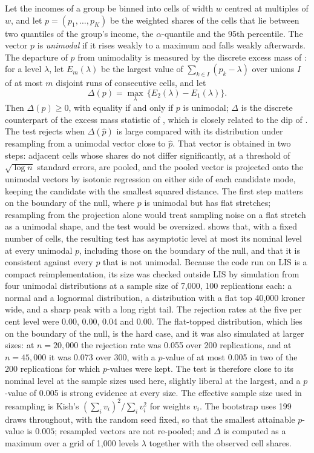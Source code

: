 Let the incomes of a group be binned into cells of width $w$ centred at multiples of $w$, and let $p=(p_1,\dots,p_K)$ be the weighted shares of the cells that lie between two quantiles of the group's income, the $\alpha$-quantile and the 95th percentile. The vector $p$ is \emph{unimodal} if it rises weakly to a maximum and falls weakly afterwards. The departure of $p$ from unimodality is measured by the discrete excess mass of \citet{MullerSawitzki1991}: for a level $\lambda$, let $E_m(\lambda)$ be the largest value of $\sum_{k\in I}(p_k-\lambda)$ over unions $I$ of at most $m$ disjoint runs of consecutive cells, and let
\[
\Delta(p)=\max_{\lambda}\,\{E_2(\lambda)-E_1(\lambda)\}.
\]
Then $\Delta(p)\ge0$, with equality if and only if $p$ is unimodal; $\Delta$ is the discrete counterpart of the excess mass statistic of \citet{MullerSawitzki1991}, which is closely related to the dip of \citet{HartiganHartigan1985}. The test rejects when $\Delta(\hat p)$ is large compared with its distribution under resampling from a unimodal vector close to $\hat p$. That vector is obtained in two steps: adjacent cells whose shares do not differ significantly, at a threshold of $\sqrt{\log n}$ standard errors, are pooled, and the pooled vector is projected onto the unimodal vectors by isotonic regression on either side of each candidate mode, keeping the candidate with the smallest squared distance. The first step matters on the boundary of the null, where $p$ is unimodal but has flat stretches; resampling from the projection alone would treat sampling noise on a flat stretch as a unimodal shape, and the test would be oversized. \citet{Orujov2026} shows that, with a fixed number of cells, the resulting test has asymptotic level at most its nominal level at every unimodal $p$, including those on the boundary of the null, and that it is consistent against every $p$ that is not unimodal. Because the code run on LIS is a compact reimplementation, its size was checked outside LIS by simulation from four unimodal distributions at a sample size of 7{,}000, 100 replications each: a normal and a lognormal distribution, a distribution with a flat top 40{,}000 kroner wide, and a sharp peak with a long right tail. The rejection rates at the five per cent level were 0.00, 0.00, 0.04 and 0.00. The flat-topped distribution, which lies on the boundary of the null, is the hard case, and it was also simulated at larger sizes: at $n=20{,}000$ the rejection rate was 0.055 over 200 replications, and at $n=45{,}000$ it was 0.073 over 300, with a $p$-value of at most 0.005 in two of the 200 replications for which $p$-values were kept. The test is therefore close to its nominal level at the sample sizes used here, slightly liberal at the largest, and a $p$-value of 0.005 is strong evidence at every size. The effective sample size used in resampling is Kish's $(\sum_i v_i)^2/\sum_i v_i^2$ for weights $v_i$. The bootstrap uses 199 draws throughout, with the random seed fixed, so that the smallest attainable $p$-value is $0.005$; resampled vectors are not re-pooled; and $\Delta$ is computed as a maximum over a grid of 1{,}000 levels $\lambda$ together with the observed cell shares.


